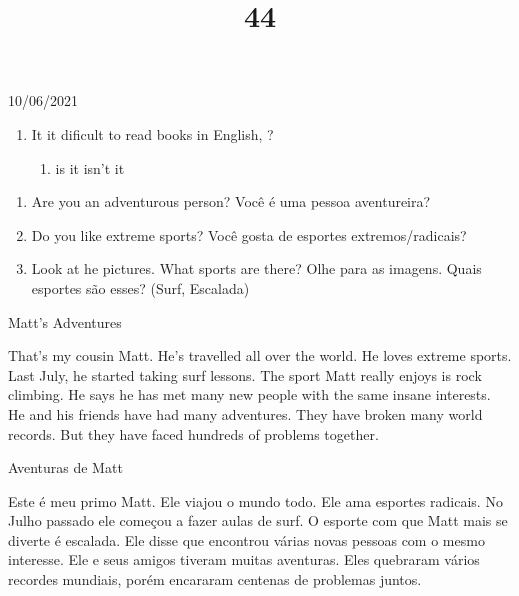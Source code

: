 \documentclass{SchoolBook}
\begin{document}
\begin{day}{10/06/2021}
\begin{enumerate}
            \item[2.] It it dificult to read books in English, \uline{\hspace{2cm}}?
            \begin{enumerate}
                \item[a)] is it
                \itemc[b)] isn't it
            \end{enumerate}
        \end{enumerate}
        
        \begin{enumerate}
            \item[1.] Are you an adventurous person?
            \response Você é uma pessoa aventureira?
            
            \item[2.] Do you like extreme sports?
            \response Você gosta de esportes extremos/radicais?
            
            \item[3.] Look at he pictures. What sports are there?
            \response Olhe para as imagens. Quais esportes são esses? (Surf, Escalada)
        \end{enumerate}
        
        \begin{multicols}{2}
            \title{4}{Matt's Adventures}
            
            That's my cousin Matt. He's travelled all over the world. He loves extreme sports. Last July, he started taking surf lessons. The sport Matt really enjoys is rock climbing. He says he has met many new people with the same insane interests. He and his friends have had many adventures. They have broken many world records. But they have faced hundreds of problems together.
            \vfill\columnbreak
            \title{4}{Aventuras de Matt}
            
            Este é meu primo Matt. Ele viajou o mundo todo. Ele ama esportes radicais. No Julho passado ele começou a fazer aulas de surf. O esporte com que Matt mais se diverte é escalada. Ele disse que encontrou várias novas pessoas com o mesmo interesse. Ele e seus amigos tiveram muitas aventuras. Eles quebraram vários recordes mundiais, porém encararam centenas de problemas juntos.
        \end{multicols}
    \end{day}
    
\end{document}
